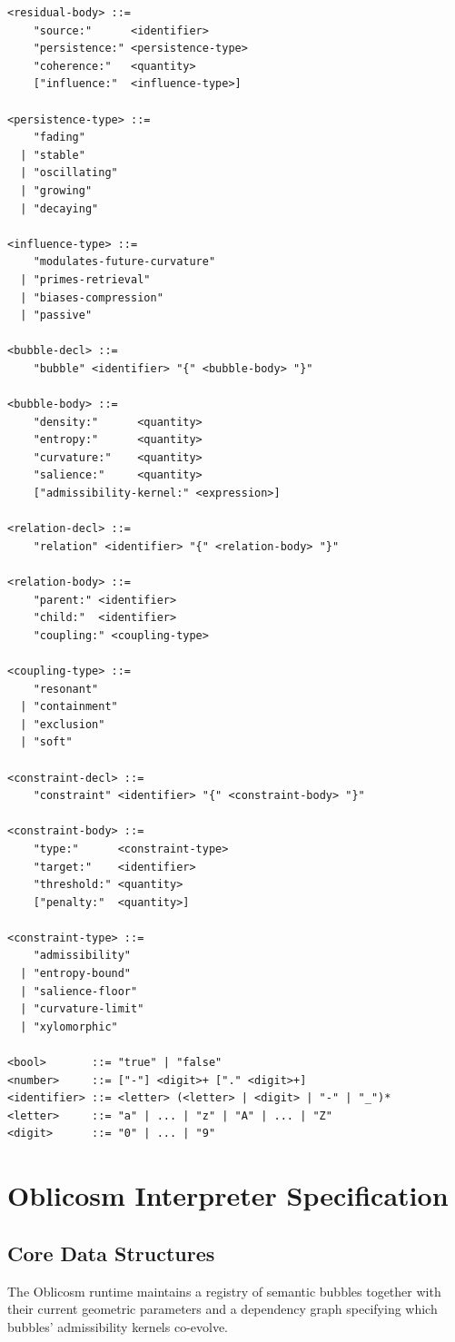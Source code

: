 \documentclass[12pt,oneside]{book}
\theoremstyle{plain}
\theoremstyle{definition}
\theoremstyle{plain}
\begin{document}
\begin{lstlisting}
<residual-body> ::=
    "source:"      <identifier>
    "persistence:" <persistence-type>
    "coherence:"   <quantity>
    ["influence:"  <influence-type>]

<persistence-type> ::=
    "fading"
  | "stable"
  | "oscillating"
  | "growing"
  | "decaying"

<influence-type> ::=
    "modulates-future-curvature"
  | "primes-retrieval"
  | "biases-compression"
  | "passive"

<bubble-decl> ::=
    "bubble" <identifier> "{" <bubble-body> "}"

<bubble-body> ::=
    "density:"      <quantity>
    "entropy:"      <quantity>
    "curvature:"    <quantity>
    "salience:"     <quantity>
    ["admissibility-kernel:" <expression>]

<relation-decl> ::=
    "relation" <identifier> "{" <relation-body> "}"

<relation-body> ::=
    "parent:" <identifier>
    "child:"  <identifier>
    "coupling:" <coupling-type>

<coupling-type> ::=
    "resonant"
  | "containment"
  | "exclusion"
  | "soft"

<constraint-decl> ::=
    "constraint" <identifier> "{" <constraint-body> "}"

<constraint-body> ::=
    "type:"      <constraint-type>
    "target:"    <identifier>
    "threshold:" <quantity>
    ["penalty:"  <quantity>]

<constraint-type> ::=
    "admissibility"
  | "entropy-bound"
  | "salience-floor"
  | "curvature-limit"
  | "xylomorphic"

<bool>       ::= "true" | "false"
<number>     ::= ["-"] <digit>+ ["." <digit>+]
<identifier> ::= <letter> (<letter> | <digit> | "-" | "_")*
<letter>     ::= "a" | ... | "z" | "A" | ... | "Z"
<digit>      ::= "0" | ... | "9"
\end{lstlisting}

\chapter{Oblicosm Interpreter Specification}
\label{app:oblicosm}

\section{Core Data Structures}

The Oblicosm runtime maintains a registry of semantic bubbles together with their current geometric parameters and a dependency graph specifying which bubbles' admissibility kernels co-evolve.
\end{document}
